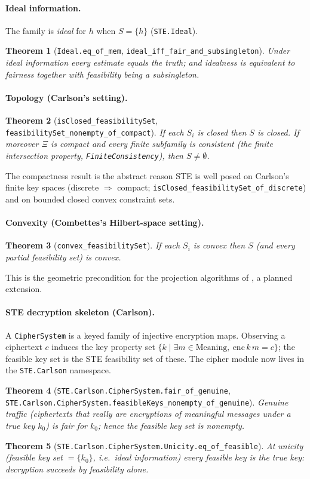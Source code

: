 \documentclass[11pt]{article}
\newtheorem{theorem}{Theorem}
\begin{document}
\paragraph{Ideal information.}
The family is \emph{ideal} for $h$ when $S=\{h\}$ (\texttt{STE.Ideal}).
\begin{theorem}[\texttt{Ideal.eq\_of\_mem},
\texttt{ideal\_iff\_fair\_and\_subsingleton}]
Under ideal information every estimate equals the truth; and idealness is
equivalent to fairness together with feasibility being a subsingleton.
\end{theorem}

\paragraph{Topology (Carlson's setting).}
\begin{theorem}[\texttt{isClosed\_feasibilitySet},
\texttt{feasibilitySet\_nonempty\_of\_compact}]
If each $S_i$ is closed then $S$ is closed. If moreover $\Xi$ is compact
and every finite subfamily is consistent (the finite intersection
property, \texttt{FiniteConsistency}), then $S\ne\emptyset$.
\end{theorem}
\noindent The compactness result is the abstract reason STE is well posed
on Carlson's finite key spaces (discrete $\Rightarrow$ compact;
\texttt{isClosed\_feasibilitySet\_of\_discrete}) and on bounded closed
convex constraint sets.

\paragraph{Convexity (Combettes's Hilbert-space setting).}
\begin{theorem}[\texttt{convex\_feasibilitySet}]
If each $S_i$ is convex then $S$ (and every partial feasibility set) is
convex.
\end{theorem}
\noindent This is the geometric precondition for the projection
algorithms of \citet{youla1982,bauschke1996}, a planned extension.

\paragraph{STE decryption skeleton (Carlson).}
A \texttt{CipherSystem} is a keyed family of injective encryption maps.
Observing a ciphertext $c$ induces the key property set
$\{k \mid \exists m\in\mathrm{Meaning},\ \mathrm{enc}\,k\,m=c\}$; the
feasible key set is the STE feasibility set of these. The cipher module
now lives in the \texttt{STE.Carlson} namespace.
\begin{theorem}[\texttt{STE.Carlson.CipherSystem.fair\_of\_genuine},
\texttt{STE.Carlson.CipherSystem.feasibleKeys\_nonempty\_of\_genuine}]
Genuine traffic (ciphertexts that really are encryptions of meaningful
messages under a true key $k_0$) is fair for $k_0$; hence the feasible
key set is nonempty.
\end{theorem}
\begin{theorem}[\texttt{STE.Carlson.CipherSystem.Unicity.eq\_of\_feasible}]
At unicity (feasible key set $=\{k_0\}$, i.e.\ ideal information) every
feasible key is the true key: decryption succeeds by feasibility alone.
\end{theorem}
\end{document}
